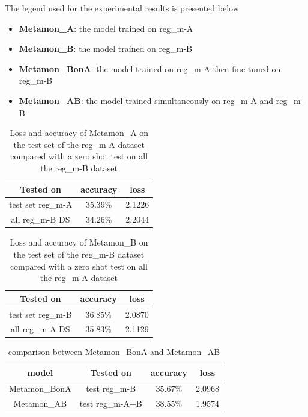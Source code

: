 \documentclass{article}
\begin{document}
The legend used for the experimental results is presented below
\begin{itemize}
    \item \textbf{Metamon\_A}: the model trained on reg\_m-A
    \item \textbf{Metamon\_B}: the model trained on reg\_m-B
    \item \textbf{Metamon\_BonA}: the model trained on reg\_m-A then fine tuned on reg\_m-B 
    \item \textbf{Metamon\_AB}: the model trained simultaneously on reg\_m-A and reg\_m-B
\end{itemize}


\begin{table}[H]
    \centering
    \begin{tabular}{c|c|c}
        \hline 
         Tested on & accuracy & loss \\
        \hline 
        test set reg\_m-A & 35.39\% & 2.1226 \\
        \hline 
         all reg\_m-B DS & 34.26\% & 2.2044 \\
         \hline
    \end{tabular}
    \caption{Loss and accuracy of Metamon\_A on the test set of the reg\_m-A dataset compared with a zero shot test on all the reg\_m-B dataset }
    \label{t1}
\end{table}{}

\begin{table}[H]
    \centering
    \begin{tabular}{c|c|c}
        \hline 
         Tested on & accuracy & loss \\
        \hline 
         test set reg\_m-B & 36.85\% & 2.0870 \\
         \hline 
         all reg\_m-A  DS& 35.83\% & 2.1129\\
         \hline 
    \end{tabular}
    \caption{Loss and accuracy of Metamon\_B on the test set of the reg\_m-B dataset compared with a zero shot test on all the reg\_m-A dataset }
    \label{t2}
\end{table}{}

\begin{table}[H]
    \centering
    \begin{tabular}{c|c|c|c}
         \hline 
         model &Tested on & accuracy & loss \\
        \hline 
         Metamon\_BonA & test reg\_m-B & 35.67\% & 2.0968\\
         \hline 
         Metamon\_AB & test reg\_m-A+B & 38.55\% & 1.9574\\
         \hline 
    \end{tabular}
    \caption{comparison between Metamon\_BonA and Metamon\_AB }
    \label{t3}
\end{table}{}
\end{document}
